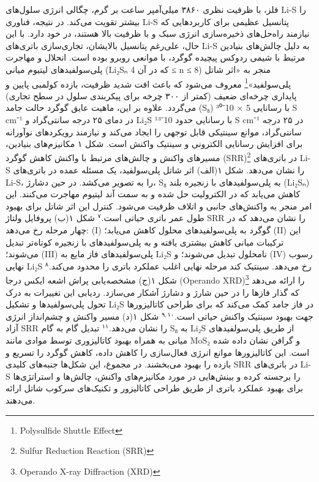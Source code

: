 \documentclass[12pt,a4paper,twocolumn]{article} %
\newcommand{\persian}[1]{\textfarsi{#1}}
\newcommand{\english}[1]{\textenglish{#1}}
\begin{document}


\persian{
فلز، با ظرفیت نظری ۳۸۶۰ میلی‌آمپر ساعت بر گرم، چگالی انرژی سلول‌های \english{Li-S} را بیشتر تقویت می‌کند. در نتیجه، فناوری \english{Li-S} پتانسیل عظیمی برای کاربردهایی که نیازمند راه‌حل‌های ذخیره‌سازی انرژی سبک و با ظرفیت بالا هستند، در خود دارد.
}
\persian{
با این حال، علی‌رغم پتانسیل بالایشان، تجاری‌سازی باتری‌های \english{Li-S} به دلیل چالش‌های بنیادین مرتبط با شیمی ردوکس پیچیده گوگرد، با موانعی روبرو بوده است. انحلال و مهاجرت پلی‌سولفیدهای لیتیوم میانی (\english{Li₂Sₙ} که در آن \english{4 ≤ n ≤ 8}) منجر به «اثر شاتل پلی‌سولفید»\footnote{\english{Polysulfide Shuttle Effect}} معروف می‌شود که باعث افت شدید ظرفیت، بازده کولمبی پایین و پایداری چرخه‌ای ضعیف (کمتر از ۳۰۰ چرخه برای پیکربندی سلول در سطح تجاری) می‌گردد. علاوه بر این، ماهیت عایق گوگرد حالت جامد (\english{S₈}) با رسانایی \english{5 × 10⁻³⁰ S cm⁻¹} در دمای ۲۵ درجه سانتی‌گراد و \english{Li₂S} با رسانایی حدود \english{10⁻¹³ S cm⁻¹} در ۲۵ درجه سانتی‌گراد، موانع سینتیکی قابل توجهی را ایجاد می‌کند و نیازمند رویکردهای نوآورانه برای افزایش رسانایی الکترونی و سینتیک واکنش است.
}
\persian{
شکل ۱ مکانیزم‌های بنیادین، مسیرهای واکنش و چالش‌های مرتبط با واکنش کاهش گوگرد (SRR)\footnote{\english{Sulfur Reduction Reaction (SRR)}} در باتری‌های \english{Li-S} را نشان می‌دهد. شکل ۱(الف) اثر شاتل پلی‌سولفید، یک مسئله عمده در باتری‌های \english{Li-S}، را به تصویر می‌کشد. در حین دشارژ، \english{S₈} به پلی‌سولفیدهای با زنجیره بلند (\english{Li₂Sₙ}) کاهش می‌یابد که در الکترولیت حل شده و به سمت آند لیتیوم مهاجرت می‌کنند. این امر منجر به واکنش‌های جانبی و اتلاف ظرفیت می‌شود. کنترل این اثر شاتل برای بهبود طول عمر باتری حیاتی است.$^۷$
}
\persian{
شکل ۱(ب) پروفایل ولتاژ \english{SRR} را نشان می‌دهد که در چهار مرحله رخ می‌دهد: (I) گوگرد به پلی‌سولفیدهای محلول کاهش می‌یابد؛ (II) این ترکیبات میانی کاهش بیشتری یافته و به پلی‌سولفیدهای با زنجیره کوتاه‌تر تبدیل می‌شوند؛ (III) پلی‌سولفیدهای فاز مایع به \english{Li₂S} نامحلول تبدیل می‌شوند؛ و (IV) رسوب نهایی \english{Li₂S} رخ می‌دهد. سینتیک کند مرحله نهایی اغلب عملکرد باتری را محدود می‌کند.$^۸$ شکل ۱(ج) مشخصه‌یابی پراش اشعه ایکس درجا (Operando XRD)\footnote{\english{Operando X-ray Diffraction (XRD)}} را ارائه می‌دهد که گذار فازها را در حین شارژ و دشارژ آشکار می‌سازد. ردیابی این تغییرات به درک تحول پلی‌سولفیدها و تشکیل \english{Li₂S} در فاز جامد کمک می‌کند که برای طراحی کاتالیزورها جهت بهبود سینتیک واکنش حیاتی است.$^{۹,۱۰}$ شکل ۱(د) مسیر واکنش و چشم‌انداز انرژی آزاد \english{SRR} را نشان می‌دهد.$^{۱۱}$ تبدیل گام به گام \english{S₈} به \english{Li₂S} از طریق پلی‌سولفیدهای میانی به همراه بهبود کاتالیزوری توسط موادی مانند \english{MoS₂} و گرافن نشان داده شده است. این کاتالیزورها موانع انرژی فعال‌سازی را کاهش داده، کاهش گوگرد را تسریع و بازده را بهبود می‌بخشند. در مجموع، این شکل‌ها جنبه‌های کلیدی \english{SRR} در باتری‌های \english{Li-S} را برجسته کرده و بینش‌هایی در مورد مکانیزم‌های واکنش، چالش‌ها و استراتژی‌ها برای بهبود عملکرد باتری از طریق طراحی کاتالیزور و تکنیک‌های سرکوب شاتل ارائه می‌دهند.
}
\end{document}
